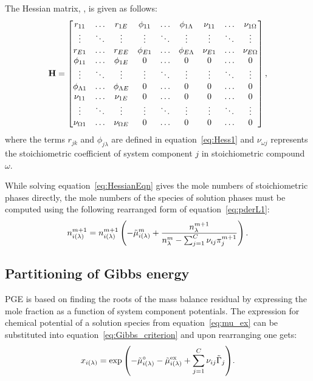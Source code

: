 The Hessian matrix, \Hessian, is given as follows:
\begin{equation}\label{eq:GEM_mat}
\mathbf{H} =
    \begin{bmatrix}
      r_{11} & \dots & r_{1E} & \phi_{11} & \dots & \phi_{1\Lambda} & \nu_{11} & \dots & \nu_{1\Omega} \\
      \vdots & \ddots & \vdots & \vdots & \ddots & \vdots & \vdots & \ddots & \vdots \\
      r_{E1} & \dots & r_{EE} & \phi_{E1} & \dots & \phi_{E\Lambda} & \nu_{E1} & \dots & \nu_{E\Omega} \\
      \phi_{11} & \dots & \phi_{1E} & 0 & \dots & 0 & 0 & \dots & 0 \\
      \vdots & \ddots & \vdots & \vdots & \ddots & \vdots & \vdots & \ddots & \vdots \\
      \phi_{\Lambda1} & \dots & \phi_{\Lambda E} & 0 & \dots & 0 & 0 & \dots & 0 \\
      \nu_{11} & \dots & \nu_{1E} & 0 & \dots & 0 & 0 & \dots & 0 \\
      \vdots & \ddots & \vdots & \vdots & \ddots & \vdots & \vdots & \ddots & \vdots \\
      \nu_{\Omega 1} & \dots & \nu_{\Omega E} & 0 & \dots & 0 & 0 & \dots & 0 \\
    \end{bmatrix},
\end{equation}
where the terms $r_{jk}$ and $\phi_{j\lambda}$ are defined in equation~\eqref{eq:Hess1} and $\nu_{\omega j}$ represents the stoichiometric coefficient of system component $j$ in stoichiometric compound $\omega$.

While solving equation~\eqref{eq:HessianEqn} gives the mole numbers of stoichiometric phases directly, the mole numbers of the species of solution phases must be computed using the following rearranged form of equation~\eqref{eq:pderL1}:
\begin{equation}
  n_{i(\lambda)}^{m+1} = n_{i(\lambda)}^{m+1}\left(-\tilde{\mu}_{i(\lambda)}^m + \frac{n_\lambda^{m+1}}{n_\lambda^{m} - \sum_{j = 1}^{C}\nu_{ij} \pi_j^{m+1}}\right).
\end{equation}

\subsection{Partitioning of Gibbs energy}
PGE is based on finding the roots of the mass balance residual by expressing the mole fraction as a function of system component potentials. The expression for chemical potential of a solution species from equation~\eqref{eq:mu_ex} can be substituted into equation~\eqref{eq:Gibbs_criterion} and upon rearranging one gets:
    \begin{equation}
        x_{i(\lambda)} = \exp{\left(-\ensuremath{\tilde{\mu}_{i(\lambda)}^{\circ}} - \ensuremath{\tilde{\mu}_{i(\lambda)}^\text{ex}} +  \ensuremath{\sum_{j = 1}^{C}} \ensuremath{\nu_{ij}} \ensuremath{\tilde{\Gamma}_{j}}\right)}.
    \end{equation}

